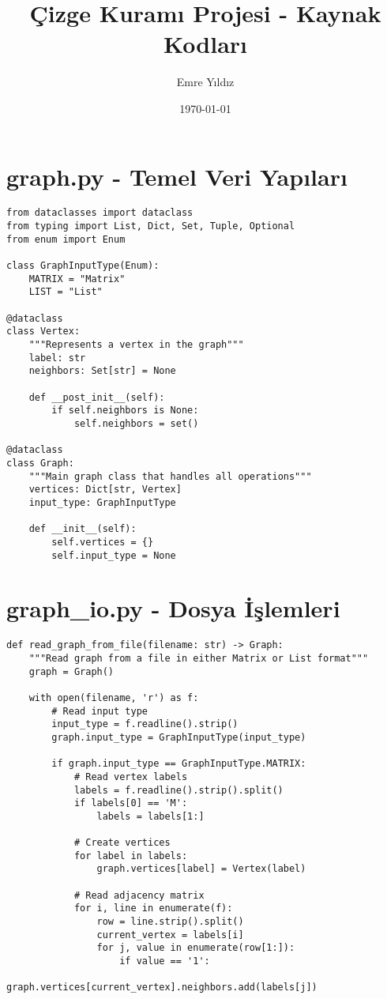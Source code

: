 \documentclass[12pt]{article}
\title{Çizge Kuramı Projesi - Kaynak Kodları}
\author{Emre Yıldız}
\date{\today}
\begin{document}
\maketitle

\section{graph.py - Temel Veri Yapıları}
\begin{lstlisting}
from dataclasses import dataclass
from typing import List, Dict, Set, Tuple, Optional
from enum import Enum

class GraphInputType(Enum):
    MATRIX = "Matrix"
    LIST = "List"

@dataclass
class Vertex:
    """Represents a vertex in the graph"""
    label: str
    neighbors: Set[str] = None
    
    def __post_init__(self):
        if self.neighbors is None:
            self.neighbors = set()

@dataclass
class Graph:
    """Main graph class that handles all operations"""
    vertices: Dict[str, Vertex]
    input_type: GraphInputType
    
    def __init__(self):
        self.vertices = {}
        self.input_type = None
\end{lstlisting}

\section{graph\_io.py - Dosya İşlemleri}
\begin{lstlisting}
def read_graph_from_file(filename: str) -> Graph:
    """Read graph from a file in either Matrix or List format"""
    graph = Graph()
    
    with open(filename, 'r') as f:
        # Read input type
        input_type = f.readline().strip()
        graph.input_type = GraphInputType(input_type)
        
        if graph.input_type == GraphInputType.MATRIX:
            # Read vertex labels
            labels = f.readline().strip().split()
            if labels[0] == 'M':
                labels = labels[1:]
            
            # Create vertices
            for label in labels:
                graph.vertices[label] = Vertex(label)
            
            # Read adjacency matrix
            for i, line in enumerate(f):
                row = line.strip().split()
                current_vertex = labels[i]
                for j, value in enumerate(row[1:]):
                    if value == '1':
                        graph.vertices[current_vertex].neighbors.add(labels[j])
\end{lstlisting}
\end{document}

